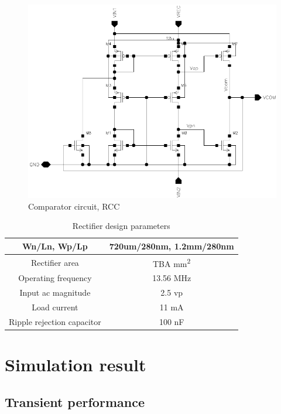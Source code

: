 \documentclass[12pt,a4paper,UKenglish]{report}
\begin{document}
\begin{figure}[H] %
   \centering
   \includegraphics[width=\textwidth]{img/rectifier_rcc5.pdf} 
   \caption{Comparator circuit, RCC }
   \label{rcc}
\end{figure}

\begin{table}[H]
\caption{Rectifier design parameters}
\begin{center}
\begin{tabular}{c|c}
\hline \hline
Wn/Ln, Wp/Lp 		& 720um/280nm, 1.2mm/280nm \\ \hline
Rectifier area 		& TBA mm\textsuperscript{2} \\ \hline
Operating frequency 	& 13.56 MHz \\ \hline
Input ac magnitude	& 2.5  \acrshort{vp}\\ \hline
Load current 		& 11 mA \\ \hline
Ripple rejection capacitor	& 100 nF \\ 
\hline \hline
\end{tabular}
\end{center}
\label{tab:rect_parameter}
\end{table}

\section{Simulation result}		%

\subsection{Transient performance}	%
\end{document}

